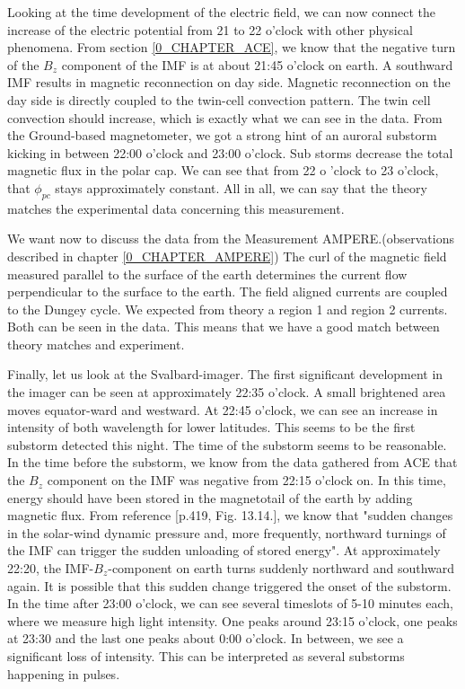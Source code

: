 \documentclass[10pt,a4paper]{article}
\begin{document}
Looking at the time development of the electric field, we can now connect the increase of the electric potential from 21 to 22 o'clock with other physical phenomena. 
From section \ref{0_CHAPTER_ACE}, we know that the negative turn of the $B_z$ component of the IMF is at about 21:45 o'clock on earth. A southward IMF results in 
magnetic reconnection on day side. Magnetic reconnection on the day side is directly coupled to the twin-cell convection pattern. The twin cell convection should increase,
which is exactly what we can see in the data. From the Ground-based magnetometer, we got a strong  hint of an auroral substorm kicking in between 22:00 o'clock and 
23:00 o'clock. Sub storms decrease the total magnetic flux in the polar cap. We can see that from 22 o 'clock to 23 o'clock, that $\phi_{pc}$ stays approximately constant.
All in all, we can say that the theory matches the experimental data concerning this measurement. 

We want now to discuss the data from the Measurement AMPERE.(observations described in chapter \ref{0_CHAPTER_AMPERE}) The  curl of the magnetic field measured parallel 
to the surface of the earth determines the current flow perpendicular to the surface to the earth. The field aligned currents are coupled to the Dungey cycle. 
We expected from theory a region 1 and region 2 currents. Both can be seen in the data. This means that we have a good match between theory matches and experiment.

Finally, let us look at the Svalbard-imager. The first significant development in the imager can be seen at approximately 22:35 o'clock. A small brightened area moves 
equator-ward and westward. At 22:45 o'clock, we can see an increase in intensity of both wavelength for lower latitudes. This seems to be the first substorm detected this 
night. The time of the substorm seems to be reasonable. In the time before the substorm, we know from the data gathered from ACE that the $B_z$ component on the IMF was 
negative from 22:15 o'clock on. In this time, energy should have been stored in the magnetotail of the earth by adding magnetic flux. 
From reference \cite{Buch2}[p.419, Fig. 13.14.], we know that "sudden changes in the solar-wind dynamic pressure and, more frequently, northward turnings of the IMF can 
trigger the sudden unloading of stored energy". At approximately 22:20, the IMF-$B_z$-component on earth turns suddenly northward and southward again. It is possible 
that this sudden change triggered the onset of the substorm. In the time after 23:00 o'clock, we can see several timeslots of 5-10 minutes each, where we measure 
high light intensity. One peaks around 23:15 o'clock, one peaks at 23:30 and the last one peaks about 0:00 o'clock. In between, we see a significant loss of intensity. 
This can be interpreted as several substorms happening in pulses. 
\end{document}
